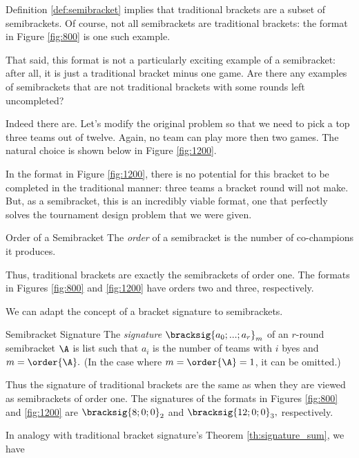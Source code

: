 {    Definition \ref{def:semibracket} implies that traditional brackets are a subset of semibrackets. Of course, not all semibrackets are traditional brackets: the format in Figure \ref{fig:800} is one such example.

    That said, this format is not a particularly exciting example of a semibracket: after all, it is just a traditional bracket minus one game. Are there any examples of semibrackets that are not traditional brackets with some rounds left uncompleted?

    Indeed there are. Let's modify the original problem so that we need to pick a top three teams out of twelve. Again, no team can play more then two games. The natural choice is shown below in Figure \ref{fig:1200}.
    

    In the format in Figure \ref{fig:1200}, there is no potential for this bracket to be completed in the traditional manner: three teams a bracket round will not make. But, as a semibracket, this is an incredibly viable format, one that perfectly solves the tournament design problem that we were given.
    
    \begin{definition}{Order of a Semibracket}{}
        The \textit{order} of a semibracket is the number of co-champions it produces.
    \end{definition}

    Thus, traditional brackets are exactly the semibrackets of order one. The formats in Figures \ref{fig:800} and \ref{fig:1200} have orders two and three, respectively.

    We can adapt the concept of a bracket signature to semibrackets.

    \begin{definition}{Semibracket Signature}{}
        The \textit{signature} $\bracksig{a_0; ...; a_r}_m$ of an $r$-round semibracket $\A$ is list such that $a_i$ is the number of teams with $i$ byes and $m = \order{\A}.$ (In the case where $m = \order{\A} = 1$, it can be omitted.)
    \end{definition}

    Thus the signature of traditional brackets are the same as when they are viewed as semibrackets of order one. The signatures of the formats in Figures \ref{fig:800} and \ref{fig:1200} are $\bracksig{8;0;0}_2$ and $\bracksig{12;0;0}_3,$ respectively.

    In analogy with traditional bracket signature's Theorem \ref{th:signature_sum}, we have

}
